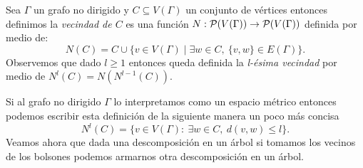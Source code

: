 \documentclass[tesis.tex]{subfiles}
\begin{document}
\begin{deff}
	Sea $\Gamma$ un grafo no dirigido y $C \subseteq V(\Gamma)$ un conjunto de vértices entonces definimos la \emph{vecindad de $C$} es una función 
	$N: {\cal{P}}(V(\Gamma)) \to {\cal{P}}(V(\Gamma))$ definida por medio de:
	\[
	N(C) = C \cup \{ v \in V(\Gamma) \mid \exists w \in C, \ \{v,w \} \in E(\Gamma) \}.
	\]
	Observemos que dado $l \ge 1$ entonces queda definida la \emph{l-ésima vecindad} por medio de $N^l(C) = N(N^{l-1}(C))$.
\end{deff}


	Si al grafo no dirigido $\Gamma$ lo interpretamos como un espacio métrico entonces podemos escribir esta definición de la siguiente manera un poco más concisa
	\[
		N^l (C) = \{ v \in V(\Gamma) : \ \exists w \in C, \  d(v,w) \le l  \}.
	\]
	Veamos ahora que dada una descomposición en un árbol si tomamos los vecinos de los bolsones podemos armarnos otra descomposición en un árbol.
\end{document}
